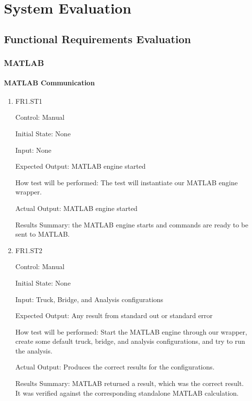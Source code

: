 \documentclass[12pt, titlepage]{article}
\begin{document}
\section{System Evaluation}

\subsection{Functional Requirements Evaluation}

\subsubsection{MATLAB}

\paragraph{MATLAB Communication}

\begin{enumerate}

  \item{FR1.ST1\\}

  Control: Manual

  Initial State: None

  Input: None

  Expected Output: MATLAB engine started

  How test will be performed: The test will instantiate our MATLAB engine wrapper.

  Actual Output: MATLAB engine started

  Results Summary: the MATLAB engine starts and commands are ready to be sent to MATLAB.

  \item{FR1.ST2\\}

  Control: Manual

  Initial State: None

  Input: Truck, Bridge, and Analysis configurations

  Expected Output: Any result from standard out or standard error

  How test will be performed: Start the MATLAB engine through our wrapper, create
  some default truck, bridge, and analysis configurations, and try to run the analysis.

  Actual Output: Produces the correct results for the configurations.

  Results Summary: MATLAB returned a result, which was the correct result. It was verified 
  against the corresponding standalone MATLAB calculation.

\end{enumerate}
\end{document}
